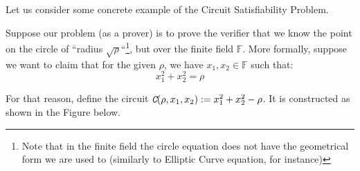 \documentclass[../lecture-notes.tex]{subfiles}
\begin{document}
Let us consider some concrete example of the Circuit Satisfiability Problem.
\begin{example}
    Suppose our problem (as a prover) is to prove the verifier that we know the point on the circle of ``radius $\sqrt{\rho}$``\footnote{Note that in the finite field the circle equation does not have the geometrical form we are used to (similarly to Elliptic Curve equation, for instance)}, but over the finite field $\mathbb{F}$. More formally, suppose we want to claim that for the given $\rho$, we have $x_1,x_2 \in \mathbb{F}$ such that:
    \begin{equation*}
        x_1^2 + x_2^2 = \rho
    \end{equation*}

    For that reason, define the circuit $\textit{\texttt{C}}(\rho,x_1,x_2) := x_1^2 + x_2^2 - \rho$. It is constructed as shown in the Figure below.
    
    \begin{center}
\end{center}
\end{example}
\end{document}
